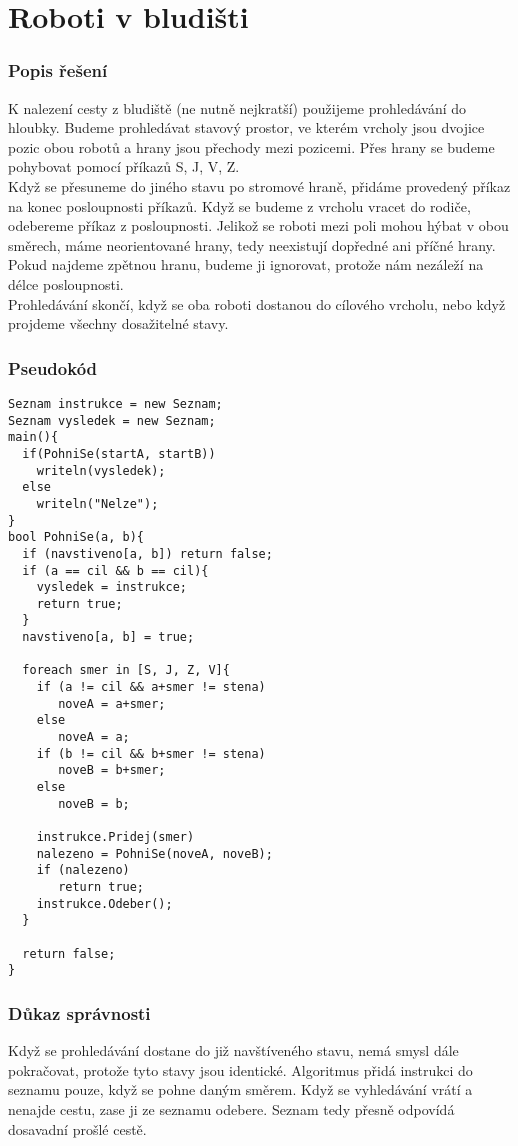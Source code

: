 \documentclass[11pt,a4paper]{article}
\begin{document}
\part*{Roboti v bludišti}
\section{Popis řešení}
K nalezení cesty z bludiště (ne nutně nejkratší) použijeme prohledávání do hloubky. Budeme prohledávat stavový prostor, ve kterém vrcholy jsou dvojice pozic obou robotů a hrany jsou přechody mezi pozicemi. Přes hrany se budeme pohybovat pomocí příkazů S, J, V, Z.\\

Když se přesuneme do jiného stavu po stromové hraně, přidáme provedený příkaz na konec posloupnosti příkazů. Když se budeme z vrcholu vracet do rodiče, odebereme příkaz z posloupnosti. Jelikož se roboti mezi poli mohou hýbat v obou směrech, máme neorientované hrany, tedy neexistují dopředné ani příčné hrany. Pokud najdeme zpětnou hranu, budeme ji ignorovat, protože nám nezáleží na délce posloupnosti.\\

Prohledávání skončí, když se oba roboti dostanou do cílového vrcholu, nebo když projdeme všechny dosažitelné stavy.\\

\section{Pseudokód}
\begin{verbatim}
Seznam instrukce = new Seznam;
Seznam vysledek = new Seznam;
main(){
  if(PohniSe(startA, startB))
    writeln(vysledek);
  else
    writeln("Nelze");  
} 
bool PohniSe(a, b){
  if (navstiveno[a, b]) return false;
  if (a == cil && b == cil){
    vysledek = instrukce;
    return true;  
  }
  navstiveno[a, b] = true;
  
  foreach smer in [S, J, Z, V]{
    if (a != cil && a+smer != stena)
       noveA = a+smer;
    else
       noveA = a;
    if (b != cil && b+smer != stena)
       noveB = b+smer;
    else
       noveB = b;  
    
    instrukce.Pridej(smer)
    nalezeno = PohniSe(noveA, noveB);    
    if (nalezeno) 
       return true;       
    instrukce.Odeber();    
  }
  
  return false;
}
\end{verbatim}

\section{Důkaz správnosti}
Když se prohledávání dostane do již navštíveného stavu, nemá smysl dále pokračovat, protože tyto stavy jsou identické. Algoritmus přidá instrukci do seznamu pouze, když se pohne daným směrem. Když se vyhledávání vrátí a nenajde cestu, zase ji ze seznamu odebere. Seznam tedy přesně odpovídá dosavadní prošlé cestě.\\
\end{document}
